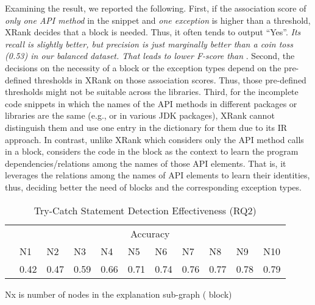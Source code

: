 

Examining the result, we reported the following. First, if the
association score of {\em only one API method} in the snippet and {\em one
exception} is higher than a threshold, XRank decides that a
 block is needed.  Thus, it often tends to output
  ``Yes''. {\em Its recall is slightly
  better, but precision is just marginally better than a coin toss
  (0.53) in our balanced dataset. That leads to lower F-score than {\tool}}.
%
Second,
the decisions on the necessity of a  block or the
exception types depend on the pre-defined thresholds in XRank on those
association scores. Thus, those pre-defined thresholds might not be
suitable across the libraries. Third, for the incomplete code
snippets in which the names of the API methods in different packages
or libraries are the same (e.g.,  or  in
various JDK packages), XRank cannot distinguish them and use one entry
in the dictionary for them due to its IR approach. In contrast, unlike
XRank which considers only the API method calls in a 
block, {\tool} considers the code in the block as the context to learn
the program dependencies/relations among the names of those API
elements. That is, it leverages the relations among the names of API
elements to learn their identities, thus, deciding better the need of
 blocks and the corresponding exception types.

\begin{table}[t]
  \caption{Try-Catch Statement Detection Effectiveness (RQ2)}
  \vspace{-12pt}
	\begin{center}
		\small
		\renewcommand{\arraystretch}{1} 
		\begin{tabular}{p{0.8cm}<{\centering}|p{0.4cm}<{\centering}|p{0.4cm}<{\centering}|p{0.4cm}<{\centering}|p{0.4cm}<{\centering}|p{0.4cm}<{\centering}|p{0.4cm}<{\centering}|p{0.4cm}<{\centering}|p{0.4cm}<{\centering}|p{0.4cm}<{\centering}|p{0.4cm}<{\centering}}
			\hline
			 	&  \multicolumn{10}{c}{Accuracy} \\
			\cline{2-11}
			     	&  N1  & N2   &  N3  & N4   &N5    & N6   &N7    & N8   &N9    & N10 \\
			\hline
			\tool     & 0.42 & 0.47 & 0.59 & 0.66 & 0.71 & 0.74 & 0.76 & 0.77 & 0.78  & 0.79  \\
			\hline
		\end{tabular}
		Nx is number of nodes in the explanation
                sub-graph ( block)
		\label{tab:rq2}
	\end{center}
\end{table}


